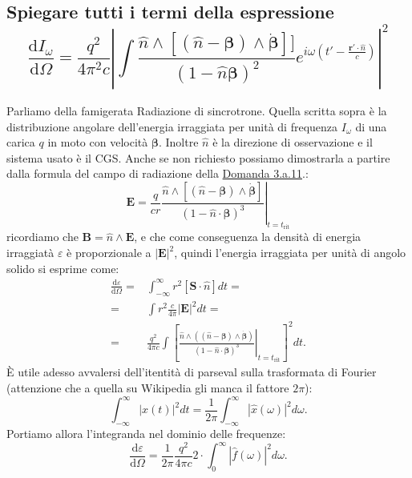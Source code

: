 \subsection[]{Spiegare tutti i termi della espressione 
\[
	\frac{\mbox{d} I_{\omega}}{\mbox{d} \Omega} = \frac{q^2}{4 \pi^2 c} \left| \int{ \frac{\hat{n} \wedge \left[ \left( \hat{n}-\boldsymbol{\beta}\right) \wedge \dot{\boldsymbol{\beta}} \right]]}{\left( 1- \hat{n} \boldsymbol{\beta}\right)^2} e^{i\omega \left( t' - \frac{\boldsymbol{r'} \cdot \hat{n}}{c} \right) }  }  \right|^2
\] 
}
\label{sec:3.a.14}
Parliamo della famigerata Radiazione di sincrotrone.
Quella scritta sopra è la distribuzione angolare dell'energia irraggiata per unità di frequenza $I_{\omega}$ di una carica $q$ in moto con velocità  $\boldsymbol{\beta}$. Inoltre $\hat{n}$ è la direzione di osservazione e il sistema usato è il CGS. 
Anche se non richiesto possiamo dimostrarla a partire dalla formula del campo di radiazione della \hyperref[sec:3.a.11]{Domanda 3.a.11}.:
\[
	\boldsymbol{E}= \left. \frac{q}{cr}
	\frac{\hat{n}\wedge\left[\left(\hat{n}-\boldsymbol{\beta}\right)\wedge\dot{\boldsymbol{\beta}}\right]}
	{\left(1-\hat{n}\cdot \boldsymbol{\beta}\right)^3} \right|_{t=t_{\text{rit}}}
\]
ricordiamo che $\boldsymbol{B}=\hat{n}\wedge \boldsymbol{E}$, e che come conseguenza la densità di energia irraggiatà $\varepsilon$ è proporzionale a $\left| \boldsymbol{E} \right| ^2$, quindi l'energia irraggiata per unità di angolo solido si esprime come:
\begin{align*}
	\frac{\mbox{d} \varepsilon}{\mbox{d} \Omega} =& \int_{-\infty}^{\infty}r^2 \left[ \boldsymbol{S}\cdot\hat{n}\right] dt =\\
	=& \int r^2 \frac{c}{4\pi}\left| \boldsymbol{E} \right|^2 dt = \\
	=& \frac{q^2}{4\pi c} \int \left[ \left. \frac{ \hat{n} \wedge \left( \left( \hat{n}-\boldsymbol{\beta} \right)\wedge\dot{\boldsymbol{\beta}}\right)}
		{\left( 1- \hat{n}\cdot \boldsymbol{\beta} \right)^3 } \right|_{t = t_{\text{rit}}} \right]^2 dt
.\end{align*}
È utile adesso avvalersi dell'itentità di parseval sulla trasformata di Fourier (attenzione che a quella su Wikipedia gli manca il fattore $2\pi$):
\[
	\int_{-\infty}^{\infty} \left| x\left( t \right)  \right|^2 dt = \frac{1}{2\pi} \int_{-\infty}^{\infty} \left| \hat{x}\left( \omega \right)\right|^2d\omega 
.\] 
Portiamo allora l'integranda nel dominio delle frequenze:
\[
	\frac{\mbox{d} \varepsilon}{\mbox{d} \Omega} = \frac{1}{2\pi}  \frac{q^2}{4\pi c} 2 \cdot\int_0^{\infty} \left| \hat{f}\left( \omega \right) \right|^2 d \omega 
.\] 
